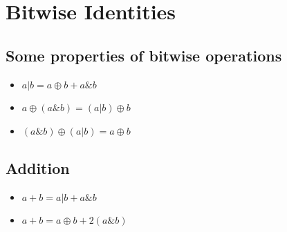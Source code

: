 	\section{Bitwise Identities}

	\subsection*{Some properties of bitwise operations}
	\begin{itemize}
	  \item $a|b = a\oplus b + a\&b$
	  \item $a\oplus(a\&b) = (a|b)\oplus b$
	  \item $(a\&b)\oplus(a|b) = a\oplus b$
	\end{itemize}

	\subsection*{Addition}
	\begin{itemize}
	  \item $a+b = a|b + a\&b$
	  \item $a+b = a\oplus b + 2(a\&b)$
	\end{itemize}





